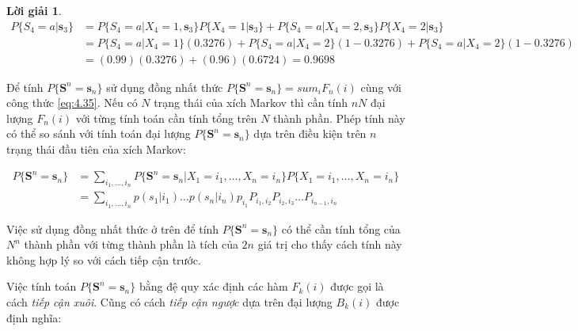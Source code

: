 \documentclass[14pt, a4paper]{article}
\numberwithin{equation}{section}
\numberwithin{figure}{section}
\theoremstyle{sltheorem}
\theoremstyle{soltheorem}
\newtheorem*{loigiai}{Lời giải}
\numberwithin{dl}{section}
\numberwithin{md}{section}
\numberwithin{vd}{section}
\begin{document}
\begin{loigiai}
        \begin{equation*}
            \begin{aligned}
                P \lbrace S_4 = a \vert \mathbf{s}_3 \rbrace &= P \lbrace S_4 = a \vert X_4 = 1, \mathbf{s}_3 \rbrace P \lbrace X_4 = 1 \vert \mathbf{s}_3 \rbrace + P \lbrace S_4 = a \vert X_4 = 2, \mathbf{s}_3 \rbrace P \lbrace X_4 = 2 \vert \mathbf{s}_3 \rbrace \\
                &= P \lbrace S_4 = a \vert X_4 = 1 \rbrace (0.3276) + P \lbrace S_4 = a \vert X_4 = 2 \rbrace (1-0.3276) + P \lbrace S_4 = a \vert X_4 = 2 \rbrace (1-0.3276) \\
                &= (0.99)(0.3276) + (0.96)(0.6724) = 0.9698
            \end{aligned}
        \end{equation*}
    \end{loigiai}

    Để tính $P \lbrace \mathbf{S}^n = \mathbf{s}_n \rbrace$ sử dụng đồng nhất thức $P \lbrace \mathbf{S}^n = \mathbf{s}_n \rbrace = sum_i F_n(i)$ cùng với công thức \ref{eq:4.35}.
    Nếu có $N$ trạng thái của xích Markov thì cần tính $nN$ đại lượng $F_n (i)$ với từng tính toán cần tính tổng trên $N$ thành phần.
    Phép tính này có thể so sánh với tính toán đại lượng $P \lbrace \mathbf{S}^n = \mathbf{s}_n \rbrace$ dựa trên điều kiện trên $n$ trạng thái đầu tiên của xích Markov:
        
    \begin{equation*}
        \begin{aligned}
            P \lbrace \mathbf{S}^n = \mathbf{s}_n \rbrace &= \sum_{i_1, \dots, i_n} P \lbrace \mathbf{S}^n = \mathbf{s}_n \vert X_1 = i_1, \dots, X_n = i_n \rbrace P \lbrace X_1 = i_1, \dots, X_n = i_n \rbrace \\
            &= \sum_{i_1,\dots, i_n} p (s_1 \vert i_1) \dots p(s_n \vert i_n) p_{i_1} P_{i_1, i_2} P_{i_2, i_3} \dots P_{i_{n-1}, i_n}
        \end{aligned}
    \end{equation*}

    Việc sử dụng đồng nhất thức ở trên để tính $P \lbrace \mathbf{S}^n = \mathbf{s}_n \rbrace$ có thể cần tính tổng của $N^n$ thành phần với từng thành phần là tích của $2n$ giá trị cho thấy cách tính này không hợp lý so với cách tiếp cận trước.

    Việc tính toán $P \lbrace \mathbf{S}^n = \mathbf{s}_n \rbrace$ bằng đệ quy xác định các hàm $F_k (i)$ được gọi là cách \textit{tiếp cận xuôi}.
    Cũng có cách \textit{tiếp cận ngược} dựa trên đại lượng $B_k(i)$ được định nghĩa:
\end{document}
